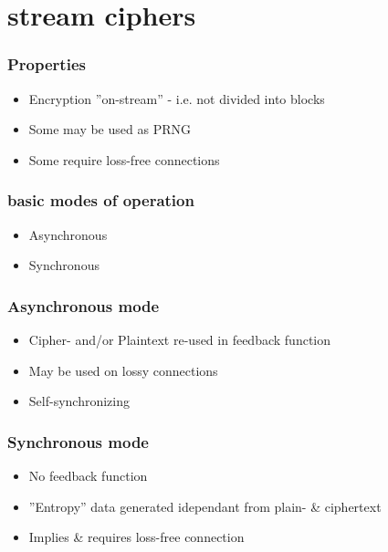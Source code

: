 
\section{stream ciphers}
\begin{frame}
\frametitle{Properties}
	\begin{itemize}
		\item<2-> Encryption ''on-stream'' - i.e. not divided into blocks
		\item<3-> Some may be used as PRNG
		\item<4-> Some require loss-free connections
	\end{itemize}
\end{frame}
\begin{frame}
\frametitle{basic modes of operation}
	\begin{itemize}
		\item<2-> Asynchronous
		\item<3-> Synchronous
	\end{itemize}
\end{frame}

\begin{frame}
\frametitle{Asynchronous mode}
	\begin{itemize}
		\item<2-> Cipher- and/or Plaintext re-used in feedback function
		\item<3-> May be used on lossy connections
		\item<4-> Self-synchronizing
	\end{itemize}
\end{frame}


\begin{frame}
\frametitle{Synchronous mode}
	\begin{itemize}
		\item<2-> No feedback function
		\item<3-> ''Entropy'' data generated idependant from plain- \& ciphertext
		\item<4-> Implies \& requires loss-free connection
	\end{itemize}
\end{frame}

